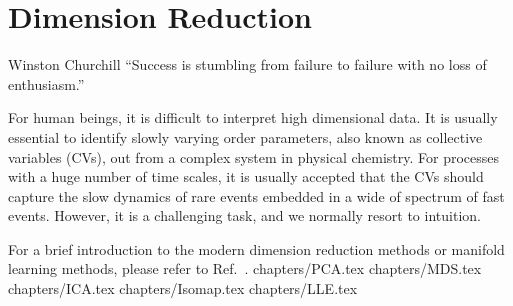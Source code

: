 \chapter{Dimension Reduction\label{chapter:DR}}
\begin{chapquote}{Winston Churchill%
	}
	``Success is stumbling from failure to failure with no loss of enthusiasm.''
\end{chapquote}
For human beings, it is difficult to interpret high dimensional data. It is usually essential to identify slowly varying order parameters, also known as collective variables (CVs), out from a complex system in physical chemistry. For processes with a huge number of time scales, it is usually accepted that the CVs should capture the slow dynamics of rare events embedded in a wide of spectrum of fast events. However, it is a challenging task, and we normally resort to intuition.

For a brief introduction to the modern dimension reduction methods or manifold learning methods, please refer to Ref.~\cite{IzamanWIREsCS2012}.
\clearpage 
 {chapters/PCA.tex}
\clearpage
 {chapters/MDS.tex}
\clearpage
 {chapters/ICA.tex}
\clearpage
 {chapters/Isomap.tex}
\clearpage
 {chapters/LLE.tex}